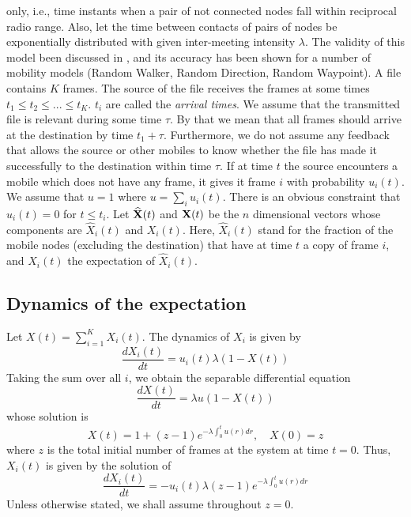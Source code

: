 \documentclass[10pt,twocolumn,conference,final]{IEEEtran}
\begin{document}
only, i.e., time instants when a pair of not connected nodes fall within reciprocal radio range.
Also, let the time between contacts of pairs of nodes be exponentially distributed
with given inter-meeting intensity $\lambda$. The validity of this
model been discussed in \cite{GNK}, and its accuracy has been shown for a number
of mobility models (Random Walker, Random Direction, Random Waypoint).
A file contains $K$ frames. The source of the file
receives the frames at some  times $t_1 \leq t_2 \leq ... \leq t_K$.
$t_i$ are called the {\it arrival times}.
We assume that the transmitted file is relevant during some time
$\tau$. By that we mean that all frames should arrive at the
destination by time $t_1 + \tau $.
Furthermore, we do not assume any feedback that allows the source or other
mobiles to know whether the file has made it successfully
to the destination within time $\tau$.
If at time $t$ the source encounters a mobile which does not have
any frame, it gives it frame $i$ with probability
$u_i(t)$. We assume that $u=1$ where $u=\sum_i u_i(t)$.
There is an obvious constraint that $u_i(t)=0$ for
$t \leq t_i$.
Let $ \widehat {\bf X}(t)$ and $ {\bf X}(t)$ be the $n$ dimensional
 vectors whose components are $ \widehat X_i (t)$ and $ X_i(t)$. Here,
 $ \widehat X_i (t)$ stand for the fraction of the mobile nodes (excluding the
destination) that have at time $t$ a copy of frame $i$, and
$X_i(t)$ the expectation of $\widehat X_i (t)$.
\subsection{Dynamics of the expectation}
Let $X(t)=\sum_{i=1}^K X_i(t)$. The dynamics of $X_i$ is given by 
\begin{equation}
\frac{ d X_i (t) } { dt} = u_i (t) \lambda (1 - X(t))
\label{dyn1}
\end{equation}
Taking the sum over all $i$, we obtain the separable differential equation
\begin{equation}
\frac{ d X (t) } { dt} = \lambda u (1 - X(t))
\label{dyn2}
\end{equation}
whose solution is
\begin{equation}
\label{all}
X(t) = 1 + (z-1) e^{ - \lambda \int_0^t u(r) dr }, \quad X(0)= z
\end{equation}
where $z$ is the total initial number of frames at the system at time $t=0$.
Thus, $X_i(t)$ is given by the solution of
\begin{equation}\label{dyn4}
\frac{d X_i (t) }{dt} = - u_i(t) \lambda
(z-1) e^{ - \lambda \int_0^t u(r)d r }
\end{equation}
Unless otherwise stated, we shall assume throughout $z=0$.
\end{document}
